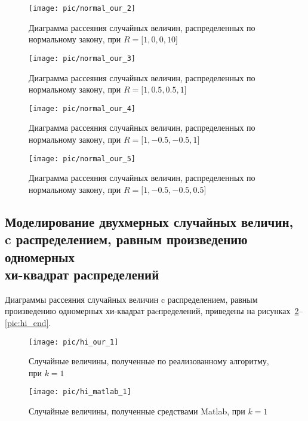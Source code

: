\begin{figure}[h!]
  \begin{minipage}[h!]{0.47\linewidth}
    \texttt{[image: pic/normal\_our\_2]}
    \caption{Диаграмма рассеяния случайных величин, распределенных по нормальному закону,
      при $ R = \big[1, 0, 0, 10 \big] $
  }
  \end{minipage}
  \hfill
  \begin{minipage}[h!]{0.47\linewidth}
    \texttt{[image: pic/normal\_our\_3]}
    \caption{Диаграмма рассеяния случайных величин, распределенных по нормальному закону,
      при $ R = \big[1, 0.5, 0.5, 1 \big] $
  }
  \end{minipage}
\end{figure}

\begin{figure}[h!]
  \begin{minipage}[h!]{0.47\linewidth}
    \texttt{[image: pic/normal\_our\_4]}
    \caption{Диаграмма рассеяния случайных величин, распределенных по нормальному закону,
      при $ R = \big[1, -0.5, -0.5, 1 \big] $
  }
  \end{minipage}
  \hfill
  \begin{minipage}[h!]{0.47\linewidth}
    \texttt{[image: pic/normal\_our\_5]}
    \caption{Диаграмма рассеяния случайных величин, распределенных по нормальному закону,
      при $ R = \big[1, -0.5, -0.5, 0.5 \big] $
  }
  \label{pic:normal_end}
  \end{minipage}
\end{figure}

\newpage 

\subsection{Моделирование двухмерных случайных величин, \\ 
  c распределением, равным произведению одномерных \\
  хи-квадрат раcпределений}

Диаграммы рассеяния случайных величин c распределением, 
равным произведению одномерных хи-квадрат раcпределений,
приведены на рисунках~\ref{pic:hi_start}--\ref{pic:hi_end}.

\begin{figure}[h!]
  \begin{minipage}[h!]{0.47\linewidth}
    \texttt{[image: pic/hi\_our\_1]}
    \caption{Случайные величины, полученные по реализованному алгоритму,
      при $ k = 1 $
  }
    \label{pic:hi_start}
  \end{minipage}
  \hfill
  \begin{minipage}[h!]{0.47\linewidth}
    \vspace{4mm}
    \texttt{[image: pic/hi\_matlab\_1]}
    \caption{Случайные величины, полученные средствами Matlab,
      при $ k = 1 $
    }
  \end{minipage}
\end{figure}

